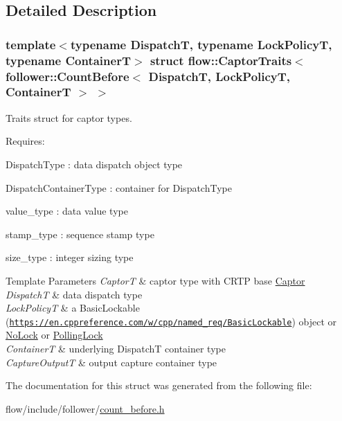 \subsection{Detailed Description}
\subsubsection*{template$<$typename DispatchT, typename Lock\+PolicyT, typename ContainerT$>$\newline
struct flow\+::\+Captor\+Traits$<$ follower\+::\+Count\+Before$<$ Dispatch\+T, Lock\+Policy\+T, Container\+T $>$ $>$}

Traits struct for captor types. 

Requires\+:
\begin{DoxyItemize}
\item {\ttfamily Dispatch\+Type} \+: data dispatch object type
\item {\ttfamily Dispatch\+Container\+Type} \+: container for {\ttfamily Dispatch\+Type}
\item {\ttfamily value\+\_\+type} \+: data value type
\item {\ttfamily stamp\+\_\+type} \+: sequence stamp type
\item {\ttfamily size\+\_\+type} \+: integer sizing type
\end{DoxyItemize}


\begin{DoxyTemplParams}{Template Parameters}
{\em CaptorT} & captor type with C\+R\+TP base {\ttfamily \hyperlink{classflow_1_1_captor}{Captor}}\\
\hline
{\em DispatchT} & data dispatch type \\
\hline
{\em Lock\+PolicyT} & a Basic\+Lockable (\href{https://en.cppreference.com/w/cpp/named_req/BasicLockable}{\tt https\+://en.\+cppreference.\+com/w/cpp/named\+\_\+req/\+Basic\+Lockable}) object or \hyperlink{structflow_1_1_no_lock}{No\+Lock} or \hyperlink{structflow_1_1_polling_lock}{Polling\+Lock} \\
\hline
{\em ContainerT} & underlying {\ttfamily DispatchT} container type \\
\hline
{\em Capture\+OutputT} & output capture container type \\
\hline
\end{DoxyTemplParams}


The documentation for this struct was generated from the following file\+:\begin{DoxyCompactItemize}
\item 
flow/include/follower/\hyperlink{count__before_8h}{count\+\_\+before.\+h}\end{DoxyCompactItemize}
